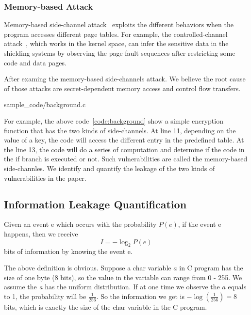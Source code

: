 \subsubsection{Memory-based Attack}
Memory-based side-channel attack~\cite{7163052} exploits the different behaviors when the
program accesses different page tables. For example, the controlled-channel attack~\cite{7163052},
which works in the kernel space, can infer the sensitive data in the shielding systems by
observing the page fault sequences after restricting some code and
data pages. 

After examing the memory-based side-channels attack. We believe the root
cause of those attacks are secret-dependent memory access and control
flow transfers.


                 {sample_code/background.c}

For example, the above code~\ref{code:background} show a simple encryption function that
has the two kinds of side-channels. At line 11, depending on the value of a key,
the code will access the different entry in the predefined table. At the
line 13, the code will do a series of computation and determine if the code in the if
branch is executed or not. Such vulnerabilities are called the memory-based 
side-channles. We identify and quantify the leakage of the two kinds of vulnerabilities 
in the paper.

\subsection{Information Leakage Quantification}
Given an event e which occurs with the probability $P(e)$, if the event e happens, 
then we receive
\begin{displaymath}
    I = - \log_2P(e)
\end{displaymath}
bits of information by knowing the event e.

The above definition is obvious. Suppose a char variable $a$ in C program has the size
of one byte (8 bits), so the value in the variable can range from 0 - 255. We assume
the \textit{a} has the uniform distribution. If at one time we observe the $a$
equals to 1, the probability will be $\frac{1}{256}$. So the information we get is 
$-\log(\frac{1}{256}) = 8$ bits, which is exactly the size of the char variable in the C program.

